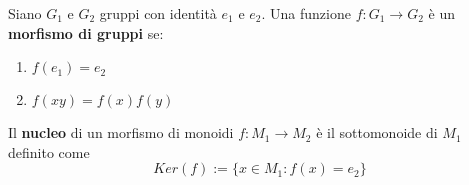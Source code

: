 \documentclass[../main.tex]{subfiles}
\begin{document}
\begin{definition}
    Siano $G_1$ e $G_2$ gruppi con identità $e_1$ e $e_2$. Una funzione $f : G_1 \rightarrow G_2$ è un \textbf{morfismo di gruppi} se:
    \begin{enumerate}[label=(\roman*)]
        \item $f(e_1) = e_2$
        \item $f(xy) = f(x)f(y)$
    \end{enumerate}
\end{definition}
\begin{definition}[Nucleo]
    Il \textbf{nucleo} di un morfismo di monoidi $f: M_1 \rightarrow M_2$ è il sottomonoide di $M_1$ definito come
    \begin{equation*}
        Ker(f):= \{x \in M_1 : f(x) = e_2\}
    \end{equation*}
\end{definition}
\end{document}

